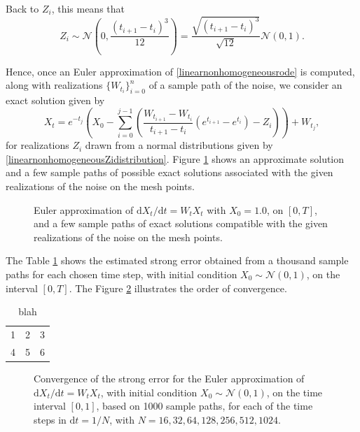 \documentclass[reqno,12pt]{amsart}
\theoremstyle{plain}%
\theoremstyle{definition}
\begin{document}
Back to $Z_i$, this means that
\begin{equation}
    \label{linearnonhomogeneousZidistribution}
    Z_i \sim \mathcal{N}\left(0, \frac{(t_{i+1}- t_i)^3}{12}\right) = \frac{\sqrt{(t_{i+1} - t_i)^3}}{\sqrt{12}}\mathcal{N}(0, 1).
\end{equation}

Hence, once an Euler approximation of \eqref{linearnonhomogeneousrode} is computed, along with realizations $\{W_{t_i}\}_{i=0}^n$ of a sample path of the noise, we consider an exact solution given by
\begin{equation}
    \label{Xtlinearnonhomogeneousrode}
    X_t = e^{-t_j}\left(X_0 - \sum_{i = 0}^{j-1} \left( \frac{W_{t_{i+1}} - W_{t_i}}{t_{i+1}-t_i}\left(e^{t_{i+1}} - e^{t_i}\right) - Z_i \right) \right) + W_{t_j},
\end{equation}
for realizations $Z_i$ drawn from a normal distributions given by \eqref{linearnonhomogeneousZidistribution}. Figure \ref{samplepathslinearnonhomogeneousrode} shows an approximate solution and a few sample paths of possible exact solutions associated with the given realizations of the noise on the mesh points.
\begin{figure}
    \label{samplepathslinearnonhomogeneousrode}
    \caption{Euler approximation of $\mathrm{d}X_t/\mathrm{d}t = W_t X_t$ with $X_0 = 1.0$, on $[0, T]$, and a few sample paths of exact solutions compatible with the given realizations of the noise on the mesh points.}
\end{figure}

The Table \ref{tablinearnonhomogeneousrode} shows the estimated strong error obtained from a thousand sample paths for each chosen time step, with initial condition $X_0 \sim \mathcal{N}(0, 1)$, on the interval $[0, T]$. The Figure \ref{figlinearnonhomogeneousrode} illustrates the order of convergence.

\begin{table}
    \label{tablinearnonhomogeneousrode}
    \begin{tabular}[htb]{l|l|l}
        1 & 2 & 3 \\
        4 & 5 & 6
    \end{tabular}
    \caption{blah}
\end{table}

\begin{figure}[htb]
    \label{figlinearnonhomogeneousrode}
    \caption{Convergence of the strong error for the Euler approximation of $\mathrm{d}X_t/\mathrm{d}t = W_t X_t$, with initial condition $X_0 \sim \mathcal{N}(0, 1)$, on the time interval $[0, 1]$, based on 1000 sample paths, for each of the time steps in $\mathrm{d}t = 1/N$, with $N = 16, 32, 64, 128, 256, 512, 1024$.}
\end{figure}
\end{document}
